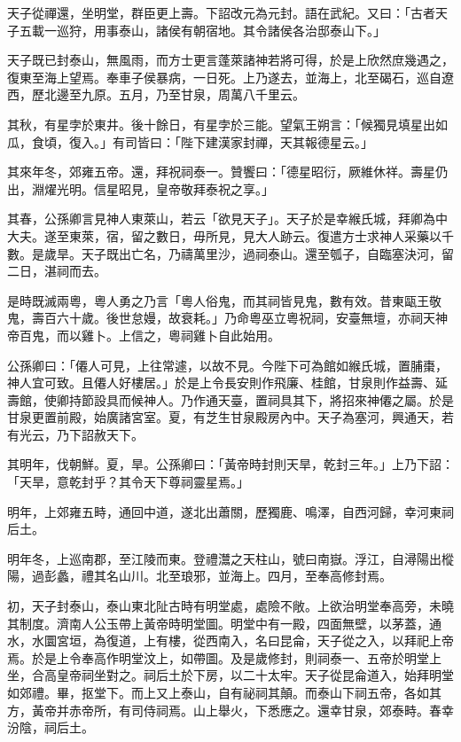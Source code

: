 \begin{pinyinscope}
天子從禪還，坐明堂，群臣更上壽。下詔改元為元封。語在武紀。又曰：「古者天子五載一巡狩，用事泰山，諸侯有朝宿地。其令諸侯各治邸泰山下。」

天子既已封泰山，無風雨，而方士更言蓬萊諸神若將可得，於是上欣然庶幾遇之，復東至海上望焉。奉車子侯暴病，一日死。上乃遂去，並海上，北至碣石，巡自遼西，歷北邊至九原。五月，乃至甘泉，周萬八千里云。

其秋，有星孛於東井。後十餘日，有星孛於三能。望氣王朔言：「候獨見填星出如瓜，食頃，復入。」有司皆曰：「陛下建漢家封禪，天其報德星云。」

其來年冬，郊雍五帝。還，拜祝祠泰一。贊饗曰：「德星昭衍，厥維休祥。壽星仍出，淵燿光明。信星昭見，皇帝敬拜泰祝之享。」

其春，公孫卿言見神人東萊山，若云「欲見天子」。天子於是幸緱氏城，拜卿為中大夫。遂至東萊，宿，留之數日，毋所見，見大人跡云。復遣方士求神人采藥以千數。是歲旱。天子既出亡名，乃禱萬里沙，過祠泰山。還至瓠子，自臨塞決河，留二日，湛祠而去。

是時既滅兩粵，粵人勇之乃言「粵人俗鬼，而其祠皆見鬼，數有效。昔東甌王敬鬼，壽百六十歲。後世怠嫚，故衰耗。」乃命粵巫立粵祝祠，安臺無壇，亦祠天神帝百鬼，而以雞卜。上信之，粵祠雞卜自此始用。

公孫卿曰：「僊人可見，上往常遽，以故不見。今陛下可為館如緱氏城，置脯棗，神人宜可致。且僊人好樓居。」於是上令長安則作飛廉、桂館，甘泉則作益壽、延壽館，使卿持節設具而候神人。乃作通天臺，置祠具其下，將招來神僊之屬。於是甘泉更置前殿，始廣諸宮室。夏，有芝生甘泉殿房內中。天子為塞河，興通天，若有光云，乃下詔赦天下。

其明年，伐朝鮮。夏，旱。公孫卿曰：「黃帝時封則天旱，乾封三年。」上乃下詔：「天旱，意乾封乎？其令天下尊祠靈星焉。」

明年，上郊雍五畤，通回中道，遂北出蕭關，歷獨鹿、鳴澤，自西河歸，幸河東祠后土。

明年冬，上巡南郡，至江陵而東。登禮灊之天柱山，號曰南嶽。浮江，自潯陽出樅陽，過彭蠡，禮其名山川。北至琅邪，並海上。四月，至奉高修封焉。

初，天子封泰山，泰山東北阯古時有明堂處，處險不敞。上欲治明堂奉高旁，未曉其制度。濟南人公玉帶上黃帝時明堂圖。明堂中有一殿，四面無壁，以茅蓋，通水，水圜宮垣，為復道，上有樓，從西南入，名曰昆侖，天子從之入，以拜祀上帝焉。於是上令奉高作明堂汶上，如帶圖。及是歲修封，則祠泰一、五帝於明堂上坐，合高皇帝祠坐對之。祠后土於下房，以二十太牢。天子從昆侖道入，始拜明堂如郊禮。畢，抠堂下。而上又上泰山，自有祕祠其顛。而泰山下祠五帝，各如其方，黃帝并赤帝所，有司侍祠焉。山上舉火，下悉應之。還幸甘泉，郊泰畤。春幸汾陰，祠后土。


\end{pinyinscope}
